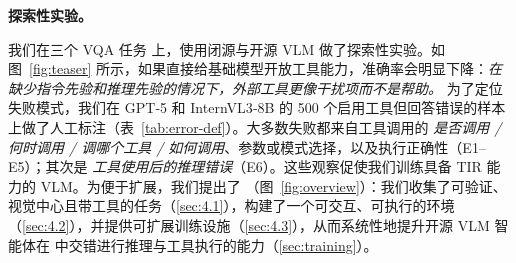 \noindent \textbf{探索性实验。}

我们在三个 VQA 任务 \cite{masry2022chartqa,chen2022unigeo,chang2022mapqa} 上，使用闭源与开源 VLM 做了探索性实验。如图~\ref{fig:teaser} 所示，如果直接给基础模型开放工具能力，准确率会明显下降：\emph{在缺少指令先验和推理先验的情况下，外部工具更像干扰项而不是帮助。} 为了定位失败模式，我们在 GPT‑5 和 InternVL3‑8B 的 500 个启用工具但回答错误的样本上做了人工标注（表~\ref{tab:error-def}）。大多数失败都来自工具调用的 \emph{是否调用 / 何时调用 / 调哪个工具 / 如何调用}、参数或模式选择，以及执行正确性（E1–E5）；其次是 \emph{工具使用后的推理错误}（E6）。这些观察促使我们训练具备 TIR 能力的 VLM。为便于扩展，我们提出了 \env{}（图~\ref{fig:overview}）：我们收集了可验证、视觉中心且带工具的任务（\cref{sec:4.1}），构建了一个可交互、可执行的环境（\cref{sec:4.2}），并提供可扩展训练设施（\cref{sec:4.3}），从而系统性地提升开源 VLM 智能体在 \env{} 中交错进行推理与工具执行的能力（\cref{sec:training}）。
